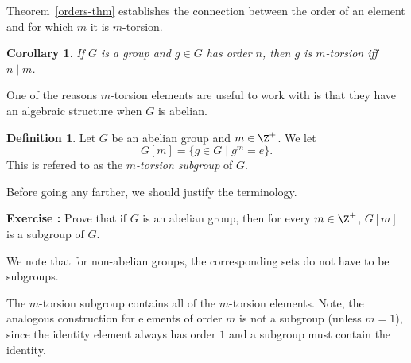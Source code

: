 \documentclass[12pt]{amsart}
\newcounter{probs}
\newenvironment{prob}{%
  \refstepcounter{probs}
  \par\medskip\noindent\textbf{Exercise \theprobs:} }{\par\medskip}
\theoremstyle{plain}
\newtheorem{cor}[thm]{Corollary}
\theoremstyle{definition}
\newtheorem{defn}[thm]{Definition}
\theoremstyle{remark}
\begin{document}
Theorem~\ref{orders-thm} establishes the connection between the
order of an element and for which $m$ it is $m$-torsion.
\begin{cor} \label{orddivtor}
  If $G$ is a group and $g\in G$ has order $n$, then $g$ is
  $m$-torsion iff $n \mid m$.
\end{cor}
One of the reasons $m$-torsion elements are useful to work with is
that they have an algebraic structure when $G$ is abelian.
\begin{defn}
  Let $G$ be an abelian group and $m\in\Z^+$.  We let
  \[ G[m] = \{g\in G\mid g^m=e\}.\]
  This is refered to as the \emph{$m$-torsion subgroup} of $G$.
\end{defn}
Before going any farther, we should justify the terminology.
\begin{prob}
  Prove that if $G$ is an abelian group, then for every $m\in\Z^+$,
  $G[m]$ is a subgroup of $G$.
\end{prob}
We note that for non-abelian groups, the corresponding sets do not
have to be subgroups.

The $m$-torsion subgroup contains all of the $m$-torsion elements.
Note, the analogous construction for elements of order $m$ is not a
subgroup (unless $m=1$), since the identity element always has order
$1$ and a subgroup must contain the identity.
\end{document}
